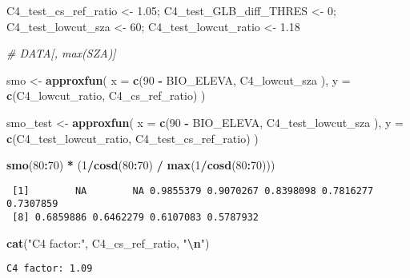 \documentclass[
  10pt,
  a4paper,oneside]{article}
\newenvironment{Shaded}{\begin{snugshade}}{\end{snugshade}}
\newcommand{\AttributeTok}[1]{\textcolor[rgb]{0.13,0.29,0.53}{#1}}
\newcommand{\CommentTok}[1]{\textcolor[rgb]{0.56,0.35,0.01}{\textit{#1}}}
\newcommand{\DecValTok}[1]{\textcolor[rgb]{0.00,0.00,0.81}{#1}}
\newcommand{\FloatTok}[1]{\textcolor[rgb]{0.00,0.00,0.81}{#1}}
\newcommand{\FunctionTok}[1]{\textcolor[rgb]{0.13,0.29,0.53}{\textbf{#1}}}
\newcommand{\NormalTok}[1]{#1}
\newcommand{\OtherTok}[1]{\textcolor[rgb]{0.56,0.35,0.01}{#1}}
\newcommand{\SpecialCharTok}[1]{\textcolor[rgb]{0.81,0.36,0.00}{\textbf{#1}}}
\newcommand{\StringTok}[1]{\textcolor[rgb]{0.31,0.60,0.02}{#1}}
\begin{document}
\begin{Shaded}
\begin{Highlighting}[]
\NormalTok{C4\_test\_cs\_ref\_ratio   }\OtherTok{\textless{}{-}} \FloatTok{1.05}\NormalTok{;}
\NormalTok{C4\_test\_GLB\_diff\_THRES }\OtherTok{\textless{}{-}}  \DecValTok{0}\NormalTok{;}
\NormalTok{C4\_test\_lowcut\_sza     }\OtherTok{\textless{}{-}} \DecValTok{60}\NormalTok{;}
\NormalTok{C4\_test\_lowcut\_ratio   }\OtherTok{\textless{}{-}} \FloatTok{1.18}

\CommentTok{\# DATA[, max(SZA)]}

\NormalTok{smo }\OtherTok{\textless{}{-}} \FunctionTok{approxfun}\NormalTok{(}
  \AttributeTok{x =} \FunctionTok{c}\NormalTok{(}\DecValTok{90} \SpecialCharTok{{-}}\NormalTok{ BIO\_ELEVA,  C4\_lowcut\_sza  ),}
  \AttributeTok{y =} \FunctionTok{c}\NormalTok{(C4\_lowcut\_ratio, C4\_cs\_ref\_ratio)}
\NormalTok{)}

\NormalTok{smo\_test }\OtherTok{\textless{}{-}} \FunctionTok{approxfun}\NormalTok{(}
  \AttributeTok{x =} \FunctionTok{c}\NormalTok{(}\DecValTok{90} \SpecialCharTok{{-}}\NormalTok{ BIO\_ELEVA,       C4\_test\_lowcut\_sza  ),}
  \AttributeTok{y =} \FunctionTok{c}\NormalTok{(C4\_test\_lowcut\_ratio, C4\_test\_cs\_ref\_ratio)}
\NormalTok{)}


\FunctionTok{smo}\NormalTok{(}\DecValTok{80}\SpecialCharTok{:}\DecValTok{70}\NormalTok{) }\SpecialCharTok{*}\NormalTok{ (}\DecValTok{1}\SpecialCharTok{/}\FunctionTok{cosd}\NormalTok{(}\DecValTok{80}\SpecialCharTok{:}\DecValTok{70}\NormalTok{) }\SpecialCharTok{/} \FunctionTok{max}\NormalTok{(}\DecValTok{1}\SpecialCharTok{/}\FunctionTok{cosd}\NormalTok{(}\DecValTok{80}\SpecialCharTok{:}\DecValTok{70}\NormalTok{)))}
\end{Highlighting}
\end{Shaded}

\begin{verbatim}
 [1]        NA        NA 0.9855379 0.9070267 0.8398098 0.7816277 0.7307859
 [8] 0.6859886 0.6462279 0.6107083 0.5787932
\end{verbatim}

\begin{Shaded}
\begin{Highlighting}[]
\FunctionTok{cat}\NormalTok{(}\StringTok{"C4 factor:"}\NormalTok{, C4\_cs\_ref\_ratio,   }\StringTok{"}\SpecialCharTok{\textbackslash{}n}\StringTok{"}\NormalTok{)}
\end{Highlighting}
\end{Shaded}

\begin{verbatim}
C4 factor: 1.09 
\end{verbatim}
\end{document}
